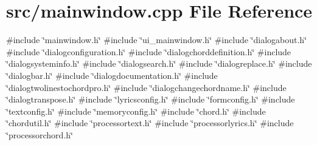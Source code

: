 \section{src/mainwindow.cpp File Reference}
\label{mainwindow_8cpp}
{\ttfamily \#include \char`\"{}mainwindow.\+h\char`\"{}}\newline
{\ttfamily \#include \char`\"{}ui\+\_\+mainwindow.\+h\char`\"{}}\newline
{\ttfamily \#include \char`\"{}dialogabout.\+h\char`\"{}}\newline
{\ttfamily \#include \char`\"{}dialogconfiguration.\+h\char`\"{}}\newline
{\ttfamily \#include \char`\"{}dialogchorddefinition.\+h\char`\"{}}\newline
{\ttfamily \#include \char`\"{}dialogsysteminfo.\+h\char`\"{}}\newline
{\ttfamily \#include \char`\"{}dialogsearch.\+h\char`\"{}}\newline
{\ttfamily \#include \char`\"{}dialogreplace.\+h\char`\"{}}\newline
{\ttfamily \#include \char`\"{}dialogbar.\+h\char`\"{}}\newline
{\ttfamily \#include \char`\"{}dialogdocumentation.\+h\char`\"{}}\newline
{\ttfamily \#include \char`\"{}dialogtwolinestochordpro.\+h\char`\"{}}\newline
{\ttfamily \#include \char`\"{}dialogchangechordname.\+h\char`\"{}}\newline
{\ttfamily \#include \char`\"{}dialogtranspose.\+h\char`\"{}}\newline
{\ttfamily \#include \char`\"{}lyricsconfig.\+h\char`\"{}}\newline
{\ttfamily \#include \char`\"{}formconfig.\+h\char`\"{}}\newline
{\ttfamily \#include \char`\"{}textconfig.\+h\char`\"{}}\newline
{\ttfamily \#include \char`\"{}memoryconfig.\+h\char`\"{}}\newline
{\ttfamily \#include \char`\"{}chord.\+h\char`\"{}}\newline
{\ttfamily \#include \char`\"{}chordutil.\+h\char`\"{}}\newline
{\ttfamily \#include \char`\"{}processortext.\+h\char`\"{}}\newline
{\ttfamily \#include \char`\"{}processorlyrics.\+h\char`\"{}}\newline
{\ttfamily \#include \char`\"{}processorchord.\+h\char`\"{}}\newline
